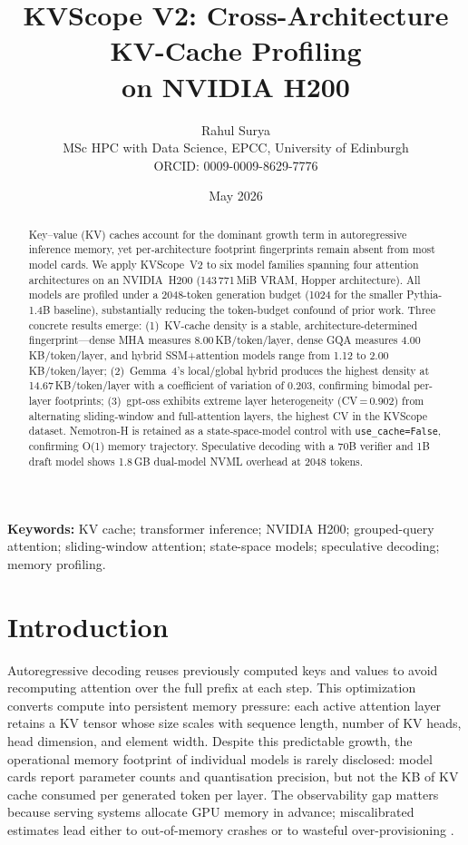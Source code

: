 \documentclass[11pt,a4paper]{article}
\title{\textbf{KVScope V2: Cross-Architecture KV-Cache Profiling\\
       on NVIDIA H200}}
\author{Rahul Surya\\[4pt]
  \small MSc HPC with Data Science, EPCC, University of Edinburgh\\
  \small ORCID: 0009-0009-8629-7776}
\date{May 2026}
\newcommand{\code}[1]{\texttt{#1}}
\begin{document}
\maketitle

\begin{abstract}
Key--value (KV) caches account for the dominant growth term in
autoregressive inference memory, yet per-architecture footprint
fingerprints remain absent from most model cards.
We apply KVScope~V2 to six model families spanning four
attention architectures on an NVIDIA~H200
(143\,771\,MiB VRAM, Hopper architecture).
All models are profiled under a 2048-token generation budget
(1024 for the smaller Pythia-1.4B baseline), substantially
reducing the token-budget confound of prior work.
Three concrete results emerge:
(1)~KV-cache density is a stable, architecture-determined
fingerprint---dense MHA measures 8.00\,KB/token/layer,
dense GQA measures 4.00\,KB/token/layer, and hybrid
SSM+attention models range from 1.12 to 2.00\,KB/token/layer;
(2)~Gemma~4's local/global hybrid produces the highest density
at 14.67\,KB/token/layer with a coefficient of variation of
0.203, confirming bimodal per-layer footprints;
(3)~gpt-oss exhibits extreme layer heterogeneity
(CV\,=\,0.902) from alternating sliding-window and
full-attention layers, the highest CV in the KVScope dataset.
Nemotron-H is retained as a state-space-model control with
\code{use\_cache=False}, confirming O(1) memory trajectory.
Speculative decoding with a 70B verifier and 1B draft model
shows 1.8\,GB dual-model NVML overhead at 2048 tokens.
\end{abstract}

\noindent\textbf{Keywords:} KV cache; transformer inference;
NVIDIA H200; grouped-query attention; sliding-window attention;
state-space models; speculative decoding; memory profiling.

\section{Introduction}
\label{sec:intro}

Autoregressive decoding reuses previously computed keys and values
to avoid recomputing attention over the full prefix at each step.
This optimization converts compute into persistent memory pressure:
each active attention layer retains a KV tensor whose size scales
with sequence length, number of KV heads, head dimension, and
element width.
Despite this predictable growth, the operational memory footprint
of individual models is rarely disclosed: model cards report
parameter counts and quantisation precision, but not the KB of KV
cache consumed per generated token per layer.
The observability gap matters because serving systems allocate
GPU memory in advance; miscalibrated estimates lead either to
out-of-memory crashes or to wasteful over-provisioning
\cite{kwon2023pagedattention}.
\end{document}
